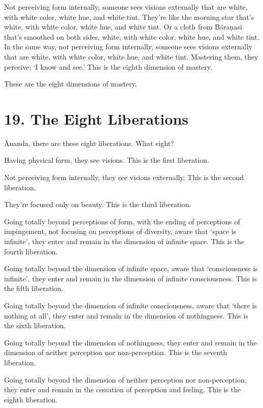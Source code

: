 \documentclass[12pt,openany]{book}%
\begin{document}
Not perceiving form internally, someone sees visions externally that are white, with white color, white hue, and white tint. They’re like the morning star that’s white, with white color, white hue, and white tint. Or a cloth from \textsanskrit{Bāraṇasī} that’s smoothed on both sides, white, with white color, white hue, and white tint. In the same way, not perceiving form internally, someone sees visions externally that are white, with white color, white hue, and white tint. Mastering them, they perceive: ‘I know and see.’ This is the eighth dimension of mastery. 

These are the eight dimensions of mastery. 

\section*{19. The Eight Liberations }

Ānanda, there are these eight liberations. What eight? 

Having physical form, they see visions. This is the first liberation. 

Not perceiving form internally, they see visions externally. This is the second liberation. 

They’re focused only on beauty. This is the third liberation. 

Going totally beyond perceptions of form, with the ending of perceptions of impingement, not focusing on perceptions of diversity, aware that ‘space is infinite’, they enter and remain in the dimension of infinite space. This is the fourth liberation. 

Going totally beyond the dimension of infinite space, aware that ‘consciousness is infinite’, they enter and remain in the dimension of infinite consciousness. This is the fifth liberation. 

Going totally beyond the dimension of infinite consciousness, aware that ‘there is nothing at all’, they enter and remain in the dimension of nothingness. This is the sixth liberation. 

Going totally beyond the dimension of nothingness, they enter and remain in the dimension of neither perception nor non-perception. This is the seventh liberation. 

Going totally beyond the dimension of neither perception nor non-perception, they enter and remain in the cessation of perception and feeling. This is the eighth liberation. 
\end{document}
